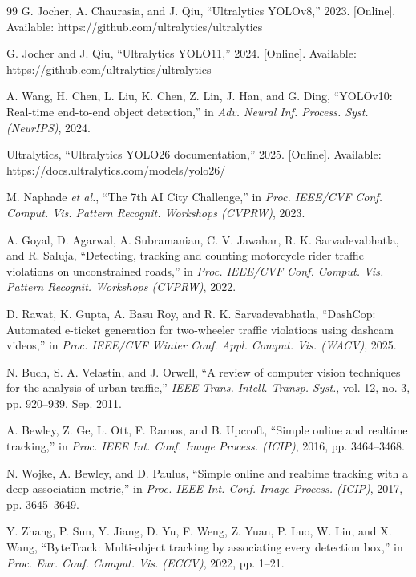 \documentclass[conference]{IEEEtran}
\begin{document}
\begin{thebibliography}{99}
G. Jocher, A. Chaurasia, and J. Qiu, ``Ultralytics YOLOv8,'' 2023. [Online]. Available: https://github.com/ultralytics/ultralytics

G. Jocher and J. Qiu, ``Ultralytics YOLO11,'' 2024. [Online]. Available: https://github.com/ultralytics/ultralytics

A. Wang, H. Chen, L. Liu, K. Chen, Z. Lin, J. Han, and G. Ding, ``YOLOv10: Real-time end-to-end object detection,'' in \emph{Adv. Neural Inf. Process. Syst. (NeurIPS)}, 2024.

Ultralytics, ``Ultralytics YOLO26 documentation,'' 2025. [Online]. Available: https://docs.ultralytics.com/models/yolo26/

M. Naphade \emph{et al.}, ``The 7th AI City Challenge,'' in \emph{Proc. IEEE/CVF Conf. Comput. Vis. Pattern Recognit. Workshops (CVPRW)}, 2023.

A. Goyal, D. Agarwal, A. Subramanian, C. V. Jawahar, R. K. Sarvadevabhatla, and R. Saluja, ``Detecting, tracking and counting motorcycle rider traffic violations on unconstrained roads,'' in \emph{Proc. IEEE/CVF Conf. Comput. Vis. Pattern Recognit. Workshops (CVPRW)}, 2022.

D. Rawat, K. Gupta, A. Basu Roy, and R. K. Sarvadevabhatla, ``DashCop: Automated e-ticket generation for two-wheeler traffic violations using dashcam videos,'' in \emph{Proc. IEEE/CVF Winter Conf. Appl. Comput. Vis. (WACV)}, 2025.

N. Buch, S. A. Velastin, and J. Orwell, ``A review of computer vision techniques for the analysis of urban traffic,'' \emph{IEEE Trans. Intell. Transp. Syst.}, vol. 12, no. 3, pp. 920--939, Sep. 2011.

A. Bewley, Z. Ge, L. Ott, F. Ramos, and B. Upcroft, ``Simple online and realtime tracking,'' in \emph{Proc. IEEE Int. Conf. Image Process. (ICIP)}, 2016, pp. 3464--3468.

N. Wojke, A. Bewley, and D. Paulus, ``Simple online and realtime tracking with a deep association metric,'' in \emph{Proc. IEEE Int. Conf. Image Process. (ICIP)}, 2017, pp. 3645--3649.

Y. Zhang, P. Sun, Y. Jiang, D. Yu, F. Weng, Z. Yuan, P. Luo, W. Liu, and X. Wang, ``ByteTrack: Multi-object tracking by associating every detection box,'' in \emph{Proc. Eur. Conf. Comput. Vis. (ECCV)}, 2022, pp. 1--21.


\end{thebibliography}
\end{document}
